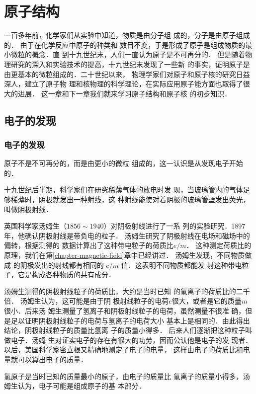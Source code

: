 \chapter{原子结构}\label{chapter-atomic-structure}

一百多年前，化学家们从实验中知道，物质是由分子组
成的，分子是由原子组成的．
由于在化学反应中原子的种类和
数目不变，于是形成了原子是组成物质的最小微粒的概念．直
到十九世纪末，人们一直认为原子是不可再分的．
但是随着物
理研究的深入和实验技术的提高，十九世纪末发现了一些新
的事实，证明原子是由更基本的微粒组成的．二十世纪以来，
物理学家们对原子和原子核的研究日益深人，建立了原子物
理和核物理的科学理论，在实际应用原子能方面也取得了很
大的进展．
这一章和下一章我们就来学习原子结构和原子核
的初步知识．


\section{电子的发现}
\subsection{电子的发现}


原子不是不可再分的，而是由更小的微粒
组成的，这一认识是从发现电子开始的．

十九世纪后半期，科学家们在研究稀薄气体的放电时发
现，当玻璃管内的气体足够稀薄时，阴极就发出一种射线，这
种射线能使对着阴极的玻璃管壁发出荧光，叫做阴极射线．

英国科学家汤姆生（$1856 \sim 1940$）对阴极射线进行了一系
列的实验研究．1897年，他确认阴极射线是带负电的粒子．
汤姆生研究了阴极射线在电场和磁场中的偏转，根据测得的
数据计算出了这种带电粒子的荷质比$e/m$．
这种测定荷质比的
原理，我们在第\ref{chapter-magnetic-field}章中已经讲过．
汤姆生发现，不同物质做成
的阴极发出的射线都有相同的
$e/m$
值．这表明不同物质都能发
射这种带电粒子，它是构成各种物质的共有成分．

汤姆生测得的阴极射线粒子的荷质比，大约是当时已知
的氢离子的荷质比的二千倍．
汤姆生认为，这可能是由于阴
极射线粒子的电荷$e$很大，或者是它的质量$m$很小．后来汤
姆生测量了氢离子和阴极射线粒子的电荷，虽然测量不很准
确，但是足以证明阴极射线粒子的电荷与氢离子的电荷大小
基本上是相同的．由此得出结论，阴极射线粒子的质量比氢离
子的质量小得多．
后来人们逐渐把这种粒子叫做电子．汤姆
生对证实电子的存在有很大的功劳，因而公认他是电子的发
现者．以后，美国科学家密立根又精确地测定了电子的电量，
这样由电子的荷质比和电量就可以算出电子的质量．

氢原子是当时已知的质量最小的原子，由电子的质量比
氢离子的质量小得多，汤姆生认为，电子可能是组成原子的基
本部分．

